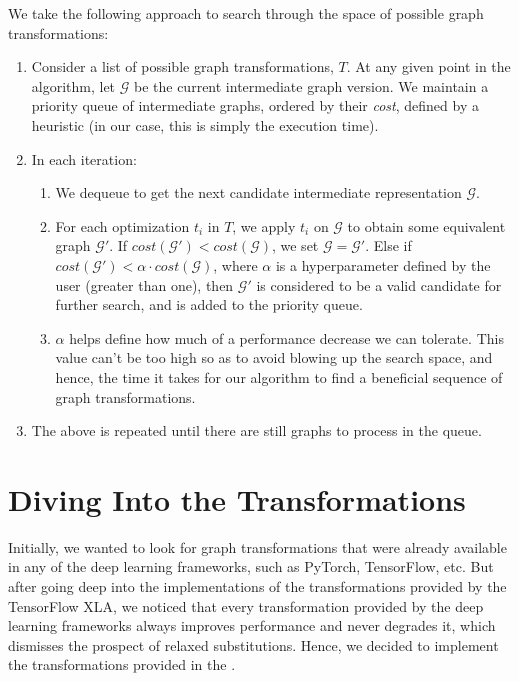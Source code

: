 \documentclass[12pt,a4paper,twoside,openright,bibliography=totocnumbered]{report}
\begin{document}
		We take the following approach to search through the space of possible graph transformations:
		\begin{enumerate}
			\item Consider a list of possible graph transformations, $T$. At any given point in the algorithm, let $\mathcal{G}$ be the current intermediate graph version. We maintain a priority queue of intermediate graphs, ordered by their \textit{cost}, defined by a heuristic (in our case, this is simply the execution time).
			\item In each iteration:
				\begin{enumerate}
					\item We dequeue to get the next candidate intermediate representation $\mathcal{G}$. 
					\item For each optimization $t_i$ in $T$, we apply $t_i$ on $\mathcal{G}$ to obtain some equivalent graph $\mathcal{G}'$. If $cost(\mathcal{G}') < cost(\mathcal{G})$, we set $\mathcal{G} = \mathcal{G}'$. Else if $cost(\mathcal{G}') < \alpha \cdot cost(\mathcal{G})$, where $\alpha$ is a hyperparameter defined by the user (greater than one), then $\mathcal{G}'$ is considered to be a valid candidate for further search, and is added to the priority queue.
					\item $\alpha$ helps define how much of a performance decrease we can tolerate. This value can't be too high so as to avoid blowing up the search space, and hence, the time it takes for our algorithm to find a beneficial sequence of graph transformations.
				\end{enumerate}

			\item The above is repeated until there are still graphs to process in the queue.

		\end{enumerate}
	\section{Diving Into the Transformations}
 Initially, we wanted to look for graph transformations that were already available in any of the deep learning frameworks, such as PyTorch, TensorFlow, etc. But after going deep into the implementations of the transformations provided by the TensorFlow XLA, we noticed that every transformation provided by the deep learning frameworks always improves performance and never degrades it, which dismisses the prospect of relaxed substitutions. Hence, we decided to implement the transformations provided in the \cite{he2016}.
\end{document}
